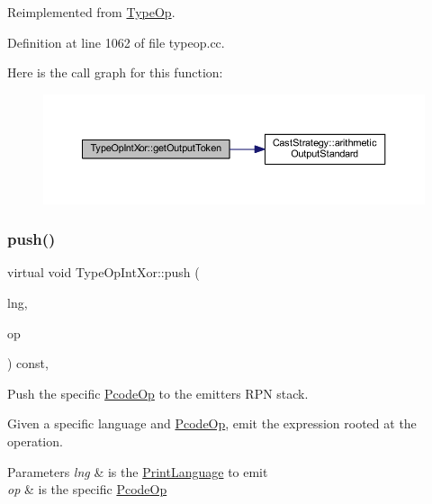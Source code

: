 Reimplemented from \mbox{\hyperlink{class_type_op_a7150ac93bb03a993735c829deb5237e7}{Type\+Op}}.



Definition at line 1062 of file typeop.\+cc.

Here is the call graph for this function\+:
\nopagebreak
\begin{figure}[H]
\begin{center}
\leavevmode
\includegraphics[width=350pt]{class_type_op_int_xor_aecfecb807f0b493995187353fc89b14b_cgraph}
\end{center}
\end{figure}
\mbox{\label{class_type_op_int_xor_a8ee9baa6e405df5fd4fe9e6a5b4ccf34}} 
\subsubsection{\texorpdfstring{push()}{push()}}
{\footnotesize\ttfamily virtual void Type\+Op\+Int\+Xor\+::push (\begin{DoxyParamCaption}\item[{\mbox{\hyperlink{class_print_language}{Print\+Language}} $\ast$}]{lng,  }\item[{const \mbox{\hyperlink{class_pcode_op}{Pcode\+Op}} $\ast$}]{op }\end{DoxyParamCaption}) const\hspace{0.3cm}{\ttfamily [inline]}, {\ttfamily [virtual]}}



Push the specific \mbox{\hyperlink{class_pcode_op}{Pcode\+Op}} to the emitter\textquotesingle{}s R\+PN stack. 

Given a specific language and \mbox{\hyperlink{class_pcode_op}{Pcode\+Op}}, emit the expression rooted at the operation. 
\begin{DoxyParams}{Parameters}
{\em lng} & is the \mbox{\hyperlink{class_print_language}{Print\+Language}} to emit \\
\hline
{\em op} & is the specific \mbox{\hyperlink{class_pcode_op}{Pcode\+Op}} \\
\hline
\end{DoxyParams}


